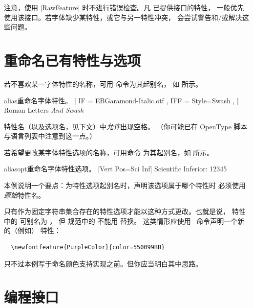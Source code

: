 \documentclass[a4paper]{l3doc}
\begin{document}
注意，使用 |RawFeature| 时不进行错误检查。凡  已提供接口的特性，
一般优先使用该接口。若字体缺少某特性，或它与另一特性冲突，
 会尝试警告和/或解决这些问题。


\section{重命名已有特性与选项}
\label{sec:aliasfontfeature}

\DescribeMacro{\aliasfontfeature}
若不喜欢某一字体特性的名称，可用
 命令为其起别名，
如  所示。

\begin{Xexample}{alias}{重命名字体特性。}
  \setmainfont{ EBGaramond-Regular.otf }[
    IF  = EBGaramond-Italic.otf ,
    IFF = {Style=Swash} ,
  ]
   Roman Letters \itshape And Swash
\end{Xexample}

特性名（以及选项名，见下文）中\emph{允许}出现空格。
（你可能已在 OpenType 脚本与语言列表中注意到这一点。）

\DescribeMacro{\aliasfontfeatureoption}
若希望更改某字体特性选项的名称，可用命令
为其起别名，如  所示。

\begin{Lexample}{aliasopt}{重命名字体特性选项。}
  [Vert Pos=Sci Inf]
   Scientific Inferior: 12345
\end{Lexample}

本例说明一个要点：为特性选项起别名时，声明该选项属于哪个特性时
必须使用\emph{原始}特性名。

只有作为固定字符串集合存在的特性选项才能以这种方式更改。也就是说，
 特性中的  可别名为 ，
但  规范中的  不能用  替换。
这类情形应使用 \cmd\newfontfeature\ 命令声明一个新的（例如） 特性：
\begin{Verbatim}
  \newfontfeature{PurpleColor}{color=550099BB}
\end{Verbatim}
只不过本例写于命名颜色支持实现之前。但你应当明白其中思路。




\section{编程接口}
\label{sec:api}
\end{document}
